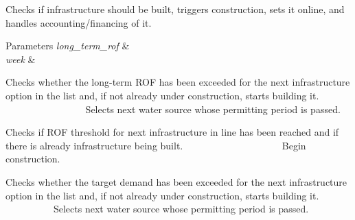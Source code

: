 Checks if infrastructure should be built, triggers construction, sets it online, and handles accounting/financing of it. 
\begin{DoxyParams}{Parameters}
{\em long\+\_\+term\+\_\+rof} & \\
\hline
{\em week} & \\
\hline
\end{DoxyParams}
Checks whether the long-\/term R\+OF has been exceeded for the next infrastructure option in the list and, if not already under construction, starts building it. ~\newline
~\newline
~\newline
~\newline
~\newline
~\newline
~\newline
~\newline
~\newline
~\newline
~\newline
~\newline
~\newline
~\newline
 Selects next water source whose permitting period is passed.

Checks if R\+OF threshold for next infrastructure in line has been reached and if there is already infrastructure being built. ~\newline
~\newline
~\newline
~\newline
~\newline
~\newline
~\newline
~\newline
~\newline
~\newline
~\newline
~\newline
 Begin construction.

Checks whether the target demand has been exceeded for the next infrastructure option in the list and, if not already under construction, starts building it. ~\newline
~\newline
~\newline
~\newline
~\newline
~\newline
~\newline
~\newline
~\newline
~\newline
 Selects next water source whose permitting period is passed.


